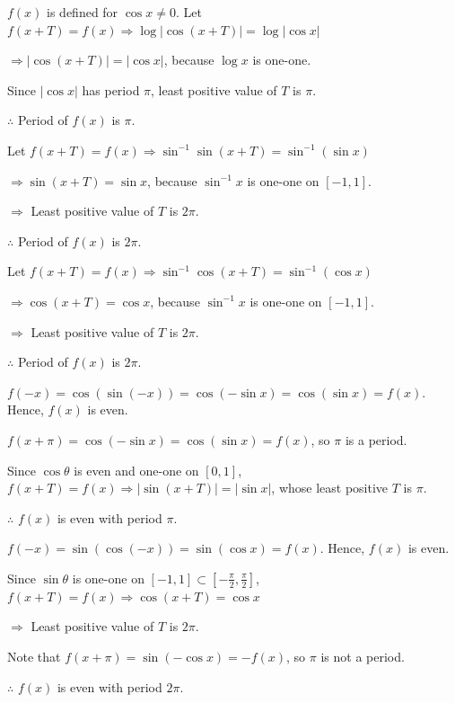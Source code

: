 \item $f(x)$ is defined for $\cos x\neq 0$. Let $f(x + T) = f(x) \Rightarrow \log|\cos(x + T)| =
  \log|\cos x|$

  $\Rightarrow |\cos(x + T)| = |\cos x|$, because $\log x$ is one-one.

  Since $|\cos x|$ has period $\pi$, least positive value of $T$ is $\pi$.

  $\therefore$ Period of $f(x)$ is $\pi$.

\item Let $f(x + T) = f(x) \Rightarrow \sin^{-1}\sin(x + T) = \sin^{-1}(\sin x)$

  $\Rightarrow \sin(x + T) = \sin x$, because $\sin^{-1}x$ is one-one on $[-1, 1]$.

  $\Rightarrow$ Least positive value of $T$ is $2\pi$.

  $\therefore$ Period of $f(x)$ is $2\pi$.

\item Let $f(x + T) = f(x) \Rightarrow \sin^{-1}\cos(x + T) = \sin^{-1}(\cos x)$

  $\Rightarrow \cos(x + T) = \cos x$, because $\sin^{-1}x$ is one-one on $[-1, 1]$.

  $\Rightarrow$ Least positive value of $T$ is $2\pi$.

  $\therefore$ Period of $f(x)$ is $2\pi$.

\item $f(-x) = \cos(\sin(-x)) = \cos(-\sin x) = \cos(\sin x) = f(x)$. Hence, $f(x)$ is even.

  $f(x + \pi) = \cos(-\sin x) = \cos(\sin x) = f(x)$, so $\pi$ is a period.

  Since $\cos\theta$ is even and one-one on $[0, 1]$, $f(x + T) = f(x) \Rightarrow |\sin(x + T)| =
  |\sin x|$, whose least positive $T$ is $\pi$.

  $\therefore$ $f(x)$ is even with period $\pi$.

\item $f(-x) = \sin(\cos(-x)) = \sin(\cos x) = f(x)$. Hence, $f(x)$ is even.

  Since $\sin\theta$ is one-one on $[-1, 1]\subset\left[-\frac{\pi}{2}, \frac{\pi}{2}\right]$,
  $f(x + T) = f(x) \Rightarrow \cos(x + T) = \cos x$

  $\Rightarrow$ Least positive value of $T$ is $2\pi$.

  Note that $f(x + \pi) = \sin(-\cos x) = -f(x)$, so $\pi$ is not a period.

  $\therefore$ $f(x)$ is even with period $2\pi$.

